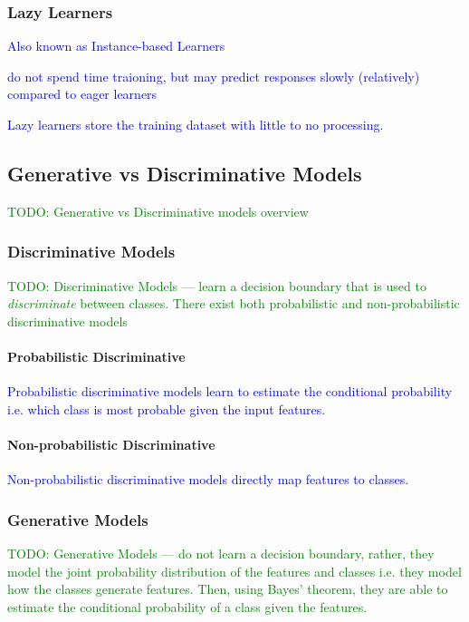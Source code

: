 \subsubsection{Lazy Learners}

\textcolor{blue}{Also known as Instance-based Learners}

\textcolor{blue}{do not spend time traioning, but may predict responses slowly (relatively) compared to eager learners}

\textcolor{blue}{Lazy learners store the training dataset with little to no processing.}


\subsection{Generative vs Discriminative Models}

\textcolor{green}{TODO: Generative vs Discriminative models overview}

\subsubsection{Discriminative Models}

\textcolor{green}{TODO: Discriminative Models --- learn a decision boundary that is used to \textit{discriminate} between classes. There exist both probabilistic and non-probabilistic discriminative models}

\paragraph{Probabilistic Discriminative}

\textcolor{blue}{Probabilistic discriminative models learn to estimate the conditional probability i.e. which class is most probable given the input features.}

\paragraph{Non-probabilistic Discriminative}

\textcolor{blue}{Non-probabilistic discriminative models directly map features to classes.}

\subsubsection{Generative Models}

\textcolor{green}{TODO: Generative Models --- do not learn a decision boundary, rather, they model the joint probability distribution of the features and classes i.e. they model how the classes generate features. Then, using Bayes' theorem, they are able to estimate the conditional probability of a class given the features.}


